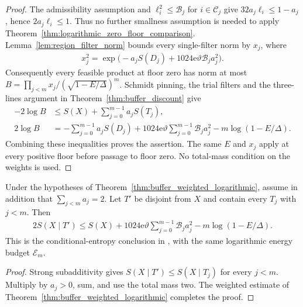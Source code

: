 \begin{proof}
    \leanok
    The admissibility assumption and $\ell_i^2\le\mathcal B_j$
    for $i\in\mathcal C_j$ give
    $32a_j\ell_i\le1-a_j$, hence $2a_j\ell_i\le1$.
    Thus no further smallness assumption is needed to apply
    Theorem~\ref{thm:logarithmic_zero_floor_comparison}.
    Lemma~\ref{lem:region_filter_norm} bounds every single-filter
    norm by $x_j$, where
    \begin{align*}
        x_j^2=\exp\bigl(-a_jS(D_j)
        +1024\mathrm e\vartheta\mathcal B_j a_j^2\bigr).
    \end{align*}
    Consequently every feasible product at floor zero has norm at most
    $B=\prod_{j<m}x_j/(\sqrt{1-E/\Delta})^m$.
    Schmidt pinning, the trial filters and the three-lines argument
    in Theorem~\ref{thm:buffer_discount} give
    \begin{align*}
        -2\log B & \le S(X)+\sum_{j=0}^{m-1}a_jS(T_j), \\
        2\log B  & =-\sum_{j=0}^{m-1}a_jS(D_j)
        +1024\mathrm e\vartheta\sum_{j=0}^{m-1}\mathcal B_j a_j^2
        -m\log(1-E/\Delta).
    \end{align*}
    Combining these inequalities proves the assertion. The same
    $E$ and $x_j$ apply at every positive floor before passage to
    floor zero. No total-mass condition on the weights is used.
\end{proof}

\begin{theorem}
    \label{thm:buffer_discount_logarithmic}
    \leanok
    Under the hypotheses of
    Theorem~\ref{thm:buffer_weighted_logarithmic}, assume in addition
    that $\sum_{j<m}a_j=2$. Let $T'$ be disjoint from $X$ and
    contain every $T_j$ with $j<m$. Then
    \begin{align*}
        2S(X\mid T')\le S(X)
        +1024\mathrm e\vartheta\sum_{j=0}^{m-1}\mathcal B_j a_j^2
        -m\log(1-E/\Delta).
    \end{align*}
    This is the conditional-entropy conclusion in
    \cite[Lemma~3.2]{OpenAI2026AreaLaw}, with the same logarithmic
    energy budget $\mathcal E_m$.
\end{theorem}
\begin{proof}
    \leanok
    Strong subadditivity gives $S(X\mid T')\le S(X\mid T_j)$
    for every $j<m$. Multiply by $a_j>0$, sum, and use the
    total mass two. The weighted estimate of
    Theorem~\ref{thm:buffer_weighted_logarithmic} completes the proof.
\end{proof}


